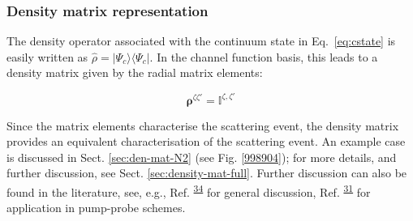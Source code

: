 \documentclass[10pt]{article}
\begin{document}
\subsubsection{Density matrix representation\label{sec:density-mat-basic}}
The density operator associated with the continuum state in Eq.~\ref{eq:cstate} is easily written as $\hat{\rho}=|\Psi_c\rangle\langle\Psi_c|$. In the channel function basis, this leads to a density matrix given by the radial matrix elements:

\begin{equation}
\mathbf{\rho}^{\zeta\zeta'} = \mathbb{I}^{\zeta,\zeta'}
\label{eqn:radial-density-mat}
\end{equation}

Since the matrix elements characterise the scattering event, the density matrix provides an equivalent characterisation of the scattering event.
An example case is discussed in Sect. \ref{sec:den-mat-N2} (see Fig. \ref{998904}); for more details, and further discussion, see Sect. \ref{sec:density-mat-full}. Further discussion can also be found in the literature, see, e.g., Ref. \textsuperscript{\hyperref[csl:34]{34}} for general discussion, Ref. \textsuperscript{\hyperref[csl:31]{31}} for application in pump-probe schemes.


\end{document}
